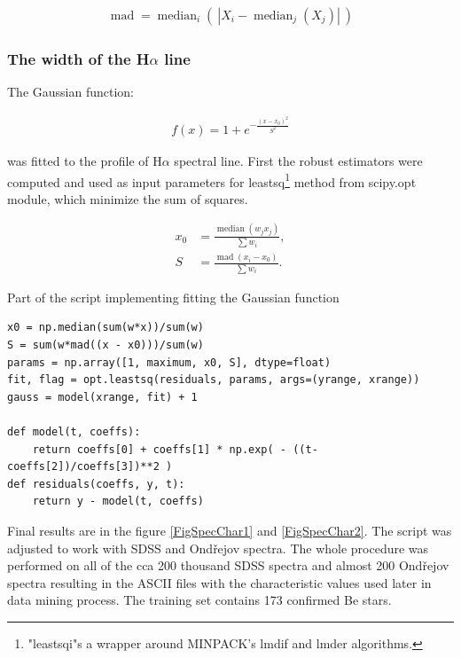 \begin{align}
  \operatorname{mad} = \operatorname{median}_{i}\left(\ \left| X_{i} -
      \operatorname{median}_{j} (X_{j}) \right|\ \right)
\end{align}

\subsubsection{The width of the H$\alpha$ line}
The Gaussian function:

\begin{align}
  \label{eq:gauss2}
  f(x) =  1 + e^{- { \frac{(x-x_0)^2 }{ S^2} } }
\end{align}

was fitted to the profile of H$\alpha$ spectral line. First the robust
estimators \citep{launer1979robustness} were computed and used as
input parameters for leastsq\footnote{"leastsqi"s a wrapper around
  MINPACK’s lmdif and lmder algorithms.} method from scipy.opt module,
which minimize the sum of squares.

\begin{align}
  x_0 & = \frac{\operatorname{median}(w_jx_j)}{\sum{w_i}}, \\
  S & = \frac{\operatorname{mad}(x_i - x_0)}{\sum{w_i}}.
\end{align}



Part of the script implementing fitting the Gaussian function

\begin{lstlisting}
x0 = np.median(sum(w*x))/sum(w)
S = sum(w*mad((x - x0)))/sum(w)
params = np.array([1, maximum, x0, S], dtype=float)
fit, flag = opt.leastsq(residuals, params, args=(yrange, xrange))
gauss = model(xrange, fit) + 1

def model(t, coeffs):
    return coeffs[0] + coeffs[1] * np.exp( - ((t-coeffs[2])/coeffs[3])**2 )
def residuals(coeffs, y, t):
    return y - model(t, coeffs)
\end{lstlisting}

Final results are in the figure \ref{FigSpecChar1} and
\ref{FigSpecChar2}. The script was adjusted to work with SDSS and
Ond\v{r}ejov spectra. The whole procedure was performed on all of the
cca 200 thousand SDSS spectra and almost 200 Ond\v{r}ejov spectra
resulting in the ASCII files with the characteristic values used later
in data mining process. The training set contains 173 confirmed Be
stars.

